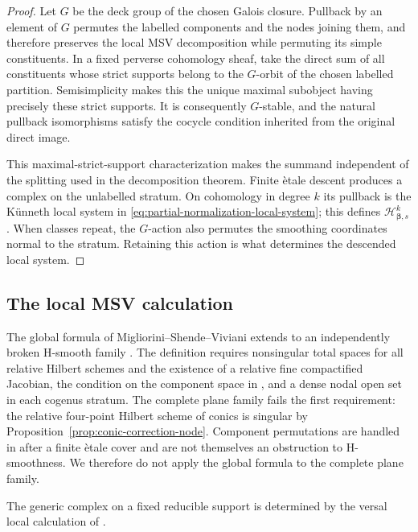 \documentclass[11pt,reqno]{amsart}
\theoremstyle{definition}
\begin{document}
\begin{proof}
Let $G$ be the deck group of the chosen Galois closure.  Pullback by an
element of $G$ permutes the labelled components and the nodes joining them,
and therefore preserves the local MSV decomposition while permuting its
simple constituents.  In a fixed perverse cohomology sheaf, take the direct
sum of all constituents whose strict supports belong to the $G$-orbit of the
chosen labelled partition.  Semisimplicity makes this the unique maximal
subobject having precisely these strict supports.  It is consequently
$G$-stable, and the natural pullback isomorphisms satisfy the cocycle
condition inherited from the original direct image.

This maximal-strict-support characterization makes the summand independent
of the splitting used in the decomposition theorem.  Finite \`etale descent
produces a complex on the unlabelled stratum.  On
cohomology in degree $k$ its pullback is the K\"unneth local system in
\eqref{eq:partial-normalization-local-system}; this defines
$\mathcal H_{\boldsymbol\beta,s}^k$.  When classes repeat, the $G$-action
also permutes the smoothing coordinates normal to the stratum.  Retaining
this action is what determines the descended local system.
\end{proof}

\subsection{The local MSV calculation}

The global formula of Migliorini--Shende--Viviani extends to an
independently broken H-smooth family
\cite[Definition~5.14 and Corollary~5.16]{MSV}.  The definition requires
nonsingular total spaces for all relative Hilbert schemes and the existence
of a relative fine compactified Jacobian, the condition on the component
space in
\cite[Proposition~5.4]{MSV}, and a dense nodal open set in each cogenus
stratum.  The complete plane family fails the first requirement: the
relative four-point Hilbert scheme of conics is singular by
Proposition~\ref{prop:conic-correction-node}.  Component permutations are
handled in \cite{MSV} after a finite \`etale cover and are not themselves an
obstruction to H-smoothness.  We therefore do not apply the global formula
to the complete plane family.

The generic complex on a fixed reducible support is determined by the versal
local calculation of \cite[Theorem~5.10]{MSV}.
\end{document}
